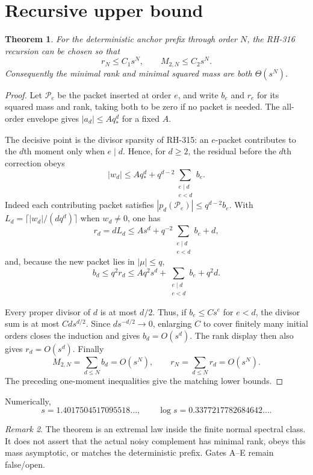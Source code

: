 \documentclass[11pt]{article}
\newtheorem{theorem}{Theorem}[section]
\theoremstyle{remark}\newtheorem{remark}[theorem]{Remark}
\begin{document}
\section{Recursive upper bound}
\begin{theorem}
For the deterministic anchor prefix through order $N$, the RH-316 recursion
can be chosen so that
\[
 r_N\le C_1s^N,
 \qquad M_{2,N}\le C_2s^N.
\]
Consequently the minimal rank and minimal squared mass are both
$\Theta(s^N)$.
\end{theorem}
\begin{proof}
Let $\mathcal P_e$ be the packet inserted at order $e$, and write $b_e$ and
$r_e$ for its squared mass and rank, taking both to be zero if no packet is
needed.  The all-order envelope gives $|a_d|\le A q_*^d$ for a fixed $A$.

The decisive point is the divisor sparsity of RH-315: an $e$-packet
contributes to the $d$th moment only when $e\mid d$.  Hence, for $d\ge2$,
the residual before the $d$th correction obeys
\[
 |w_d|\le A q_*^d+q^{d-2}
 \sum_{\substack{e\mid d\\e<d}}b_e.
\]
Indeed each contributing packet satisfies
$|p_d(\mathcal P_e)|\le q^{d-2}b_e$.  With
$L_d=\lceil |w_d|/(dq^d)\rceil$ when $w_d\ne0$, one has
\[
 r_d=dL_d\le A s^d+q^{-2}
 \sum_{\substack{e\mid d\\e<d}}b_e+d,
\]
and, because the new packet lies in $|\mu|\le q$,
\[
 b_d\le q^2r_d
 \le Aq^2s^d+
 \sum_{\substack{e\mid d\\e<d}}b_e+q^2d.
\]

Every proper divisor of $d$ is at most $d/2$.  Thus, if
$b_e\le Cs^e$ for $e<d$, the divisor sum is at most
$Cd s^{d/2}$.  Since $d s^{-d/2}\to0$, enlarging $C$ to cover finitely many
initial orders closes the induction and gives $b_d=O(s^d)$.  The rank
display then also gives $r_d=O(s^d)$.  Finally
\[
 M_{2,N}=\sum_{d\le N}b_d=O(s^N),\qquad
 r_N=\sum_{d\le N}r_d=O(s^N).
\]
The preceding one-moment inequalities give the matching lower bounds.
\end{proof}

Numerically,
\[
 s=1.4017504517095518\ldots,
 \qquad \log s=0.3377217782684642\ldots.
\]

\begin{remark}
The theorem is an extremal law inside the finite normal spectral class.  It
does not assert that the actual noisy complement has minimal rank, obeys this
mass asymptotic, or matches the deterministic prefix.  Gates A--E remain
false/open.
\end{remark}
\end{document}
